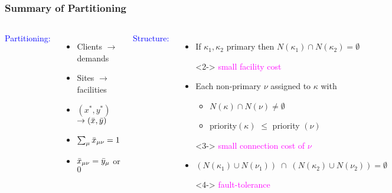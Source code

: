 \documentclass[hyperref,dvipsnames,svgnames,compress]{beamer}
\begin{document}

\begin{frame}
  \frametitle{Summary of Partitioning}

  \begin{columns}[T]
    \textcolor{blue}{Partitioning:}
    \begin{itemize}\addtolength{\itemsep}{0.5\baselineskip}
	\item Clients $\rightarrow$ demands
	\item Sites $\rightarrow$ facilities

	\item $(x^\ast,y^\ast)$ $\rightarrow ({\bar x},{\bar y})$
	\item $\sum_{\mu}{\bar x}_{\mu\nu} = 1$
	\item ${\bar x}_{\mu\nu} = {\bar y}_\mu$ or $0$
        \end{itemize}

    \textcolor{blue}{Structure:}
    \begin{itemize}

    \item If $\kappa_1,\kappa_2$ primary then
      $N(\kappa_1)\cap N(\kappa_2) = \emptyset$
    \begin{block}<2->{}
      \textcolor{Magenta}{small facility cost}
    \end{block}
  \item Each non-primary $\nu$ assigned to $\kappa$ with
	\begin{itemize}
        \item $N(\kappa)\cap N(\nu) \neq \emptyset$
	\item priority$(\kappa)$ $\le$ priority $(\nu)$
        \end{itemize}
        \begin{block}<3->{}
          \textcolor{Magenta}{small connection cost of $\nu$}
        \end{block}
  \item $(N(\kappa_1) \cup N(\nu_1))\;\cap\;(N(\kappa_2) \cup N(\nu_2)) = \emptyset$
    \begin{block}<4->{}
      \textcolor{Magenta}{fault-tolerance}
    \end{block}
  \end{itemize}
\end{columns}
\end{frame}
\end{document}
